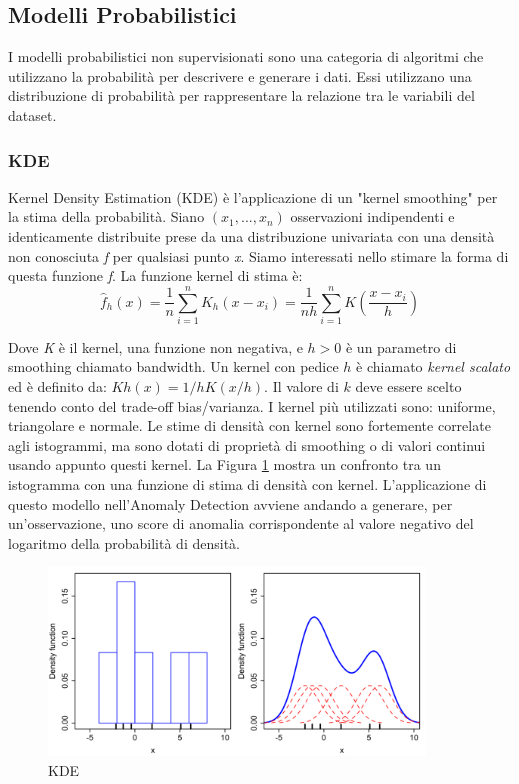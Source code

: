 \subsection{Modelli Probabilistici}
I modelli probabilistici non supervisionati sono una categoria di algoritmi che utilizzano la probabilità per descrivere e generare i dati. Essi utilizzano una distribuzione di probabilità per rappresentare la relazione tra le variabili del dataset.
\subsubsection{KDE}
Kernel Density Estimation (KDE) \cite{latecki2007outlier} è l'applicazione di un "kernel smoothing" per la stima della probabilità. 
Siano $(x_1,...,x_n)$ osservazioni indipendenti e identicamente distribuite prese da una distribuzione univariata con una densità non conosciuta \textit{f} per qualsiasi punto \textit{x}. Siamo interessati nello stimare la forma di questa funzione \textit{f}. La funzione kernel di stima è:
\[\widehat{f}_h(x)=\frac{1}{n} \sum_{i=1}^n K_h\left(x-x_i\right)=\frac{1}{n h} \sum_{i=1}^n K\left(\frac{x-x_i}{h}\right)\]

Dove \textit{K} è il kernel, una funzione non negativa, e $h>0$ è un parametro di smoothing chiamato bandwidth. Un kernel con pedice $h$ è chiamato \textit{kernel scalato} ed è definito da: $Kh(x) = 1/h K(x/h)$. 
Il valore di $k$ deve essere scelto tenendo conto del trade-off bias/varianza.
I kernel più utilizzati sono: uniforme, triangolare e normale.
Le stime di densità con kernel sono fortemente correlate agli istogrammi, ma sono dotati di proprietà di smoothing o di valori continui usando appunto questi kernel.
La Figura \ref{kde_model} mostra un confronto tra un istogramma con una funzione di stima di densità con kernel.
L'applicazione di questo modello nell'Anomaly Detection avviene andando a generare, per un'osservazione, uno score di anomalia corrispondente al valore negativo del logaritmo della probabilità di densità.

\begin{figure}[t]
	\centering
	\includegraphics[width=10cm, scale=1]{images/kde_model}
	\caption{KDE}
	\label{kde_model}
\end{figure}


